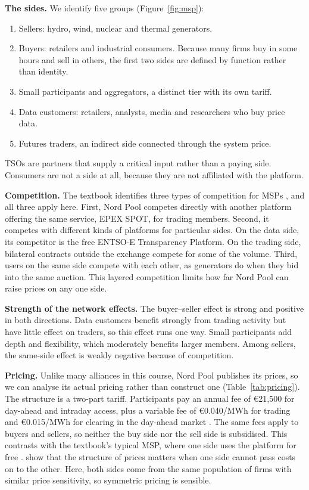 \textbf{The sides.} We identify five groups (Figure~\ref{fig:msp}):
\begin{enumerate}
  \item Sellers: hydro, wind, nuclear and thermal generators.
  \item Buyers: retailers and industrial consumers. Because many firms buy in some hours and sell in others, the first two sides are defined by function rather than identity.
  \item Small participants and aggregators, a distinct tier with its own tariff.
  \item Data customers: retailers, analysts, media and researchers who buy price data.
  \item Futures traders, an indirect side connected through the system price.
\end{enumerate}
TSOs are partners that supply a critical input rather than a paying side. Consumers are not a side at all, because they are not affiliated with the platform.

\textbf{Competition.} The textbook identifies three types of competition for MSPs \citep[Sect.~10.2.3]{OverbyAudestad2021}, and all three apply here. First, Nord Pool competes directly with another platform offering the same service, EPEX SPOT, for trading members. Second, it competes with different kinds of platforms for particular sides. On the data side, its competitor is the free ENTSO-E Transparency Platform. On the trading side, bilateral contracts outside the exchange compete for some of the volume. Third, users on the same side compete with each other, as generators do when they bid into the same auction. This layered competition limits how far Nord Pool can raise prices on any one side.

\textbf{Strength of the network effects.} The buyer--seller effect is strong and positive in both directions. Data customers benefit strongly from trading activity but have little effect on traders, so this effect runs one way. Small participants add depth and flexibility, which moderately benefits larger members. Among sellers, the same-side effect is weakly negative because of competition.



\textbf{Pricing.} Unlike many alliances in this course, Nord Pool publishes its prices, so we can analyse its actual pricing rather than construct one (Table~\ref{tab:pricing}). The structure is a two-part tariff. Participants pay an annual fee of €21,500 for day-ahead and intraday access, plus a variable fee of €0.040/MWh for trading and €0.015/MWh for clearing in the day-ahead market \citep{NPFees2026}. The same fees apply to buyers and sellers, so neither the buy side nor the sell side is subsidised. This contrasts with the textbook's typical MSP, where one side uses the platform for free \citep[Sect.~10.2.2]{OverbyAudestad2021}. \citet{RochetTirole2003} show that the structure of prices matters when one side cannot pass costs on to the other. Here, both sides come from the same population of firms with similar price sensitivity, so symmetric pricing is sensible.

